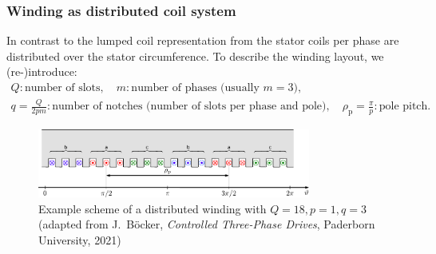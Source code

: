 \begin{frame}
	\frametitle{Winding as distributed coil system}
    In contrast to the lumped coil representation from  the stator coils per phase are distributed over the stator circumference. To describe the winding layout, we (re-)introduce:
    \begin{gather*}
		Q: \mbox{number of slots}, \quad m: \mbox{number of phases (usually $m=3$)}, \\ q=\frac{Q}{2 p m}: \mbox{number of notches  (number of slots per phase and pole)}, \quad \rho_\mathrm{p} = \frac{\pi}{p}: \mbox{pole pitch.}
	\end{gather*}
    \begin{figure}
        \centering
        \includegraphics[width=0.8\textwidth]{fig/lec05/Scheme_distributed_winding.pdf}
        \caption{Example scheme of a distributed winding with $Q=18, p = 1, q=3$ (adapted from J.~B\"ocker, \textit{Controlled Three-Phase Drives}, Paderborn University, 2021)}
        \label{fig:Scheme_distributed_winding}
    \end{figure}
\end{frame}